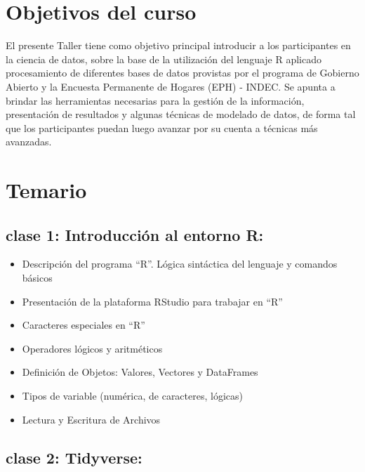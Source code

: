 \documentclass[]{book}
\providecommand{\tightlist}{%
  \setlength{\itemsep}{0pt}\setlength{\parskip}{0pt}}
\begin{document}
\hypertarget{objetivos-del-curso}{%
\section{Objetivos del curso}\label{objetivos-del-curso}}

El presente Taller tiene como objetivo principal introducir a los participantes en la ciencia de datos, sobre la base de la utilización del lenguaje R aplicado procesamiento de diferentes bases de datos provistas por el programa de Gobierno Abierto y la Encuesta Permanente de Hogares (EPH) - INDEC. Se apunta a brindar las herramientas necesarias para la gestión de la información, presentación de resultados y algunas técnicas de modelado de datos, de forma tal que los participantes puedan luego avanzar por su cuenta a técnicas más avanzadas.

\hypertarget{temario}{%
\section{Temario}\label{temario}}

\hypertarget{clase-1-introduccion-al-entorno-r}{%
\subsection{\texorpdfstring{\textbf{clase 1}: Introducción al entorno R:}{clase 1: Introducción al entorno R:}}\label{clase-1-introduccion-al-entorno-r}}

\begin{itemize}
\tightlist
\item
  Descripción del programa ``R''. Lógica sintáctica del lenguaje y comandos básicos
\item
  Presentación de la plataforma RStudio para trabajar en ``R''
\item
  Caracteres especiales en ``R''
\item
  Operadores lógicos y aritméticos
\item
  Definición de Objetos: Valores, Vectores y DataFrames
\item
  Tipos de variable (numérica, de caracteres, lógicas)
\item
  Lectura y Escritura de Archivos
\end{itemize}

\hypertarget{clase-2-tidyverse}{%
\subsection{\texorpdfstring{\textbf{clase 2}: Tidyverse:}{clase 2: Tidyverse:}}\label{clase-2-tidyverse}}
\end{document}
